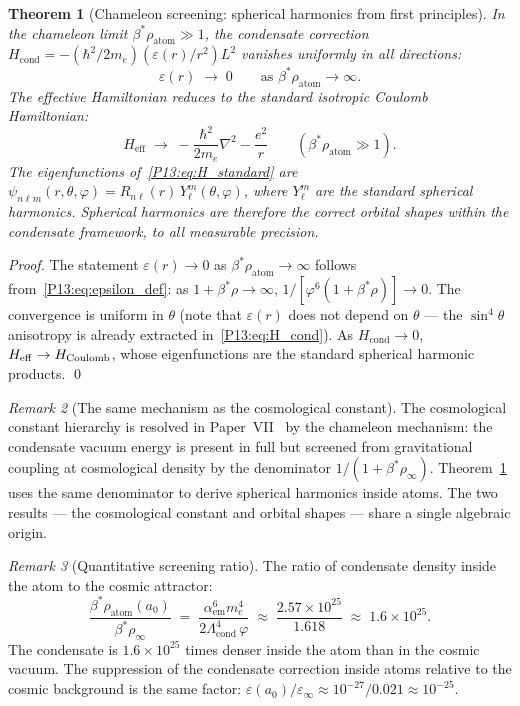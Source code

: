 \documentclass[11pt,a4paper]{article}
\newtheorem{theorem}{Theorem}[section]
\theoremstyle{definition}
\theoremstyle{remark}
\newtheorem{remark}[theorem]{Remark}
\newcommand{\vp}{\varphi}
\newcommand{\bst}{\beta^{*}}
\newcommand{\Lcond}{\Lambda_{\mathrm{cond}}}
\newcommand{\aem}{\alpha_{\mathrm{em}}}
\newcommand{\eps}{\varepsilon}
\newcommand{\Hcond}{H_{\mathrm{cond}}}
\newcommand{\Heff}{H_{\mathrm{eff}}}
\newcommand{\rhoa}{\rho_{\mathrm{atom}}}
\newcommand{\rhoinf}{\rho_{\infty}}
\newcommand{\epsr}{\varepsilon(r)}
\begin{document}
\begin{theorem}[Chameleon screening: spherical harmonics from first principles]
\label{P13:thm:chameleon_screening}
In the chameleon limit $\bst\rhoa\gg1$, the condensate correction
$\Hcond = -(\hbar^2/2m_e)(\epsr/r^2)L^2$ vanishes uniformly
in all directions:
\begin{equation}
  \epsr \;\to\; 0
  \qquad \text{as } \bst\rhoa \to \infty.
  \label{P13:eq:chameleon_limit}
\end{equation}
The effective Hamiltonian reduces to the standard isotropic
Coulomb Hamiltonian:
\begin{equation}
  \Heff \;\to\; -\frac{\hbar^2}{2m_e}\nabla^2 - \frac{e^2}{r}
  \qquad (\bst\rhoa \gg 1).
  \label{P13:eq:H_standard}
\end{equation}
The eigenfunctions of~\eqref{P13:eq:H_standard} are
$\psi_{n\ell m}(r,\theta,\varphi) = R_{n\ell}(r)\,Y_\ell^m(\theta,\varphi)$,
where $Y_\ell^m$ are the standard spherical harmonics.
Spherical harmonics are therefore the correct orbital shapes
within the condensate framework, to all measurable precision.
\end{theorem}

\begin{proof}
The statement $\epsr\to0$ as $\bst\rhoa\to\infty$ follows
from~\eqref{P13:eq:epsilon_def}: as $1+\bst\rho\to\infty$,
$1/[\vp^6(1+\bst\rho)]\to0$.
The convergence is uniform in $\theta$ (note that $\epsr$
does not depend on $\theta$ --- the $\sin^4\!\theta$ anisotropy
is already extracted in~\eqref{P13:eq:H_cond}).
As $\Hcond\to0$, $\Heff\to H_{\rm Coulomb}$, whose eigenfunctions
are the standard spherical harmonic products.
\qed
\end{proof}

\begin{remark}[The same mechanism as the cosmological constant]
\label{P13:rem:same_mechanism}
The cosmological constant hierarchy is resolved in Paper~VII~\cite{Paper7}
by the chameleon mechanism: the condensate vacuum energy is present in full
but screened from gravitational coupling at cosmological density by
the denominator $1/(1+\bst\rho_\infty)$.
Theorem~\ref{P13:thm:chameleon_screening} uses the same denominator
to derive spherical harmonics inside atoms.
The two results --- the cosmological constant and orbital shapes ---
share a single algebraic origin.
\end{remark}

\begin{remark}[Quantitative screening ratio]
\label{P13:rem:screening_ratio}
The ratio of condensate density inside the atom to the cosmic attractor:
\[
  \frac{\bst\rhoa(a_0)}{\bst\rhoinf}
  \;=\; \frac{\aem^6 m_e^4}{2\Lcond^4\,\vp}
  \;\approx\; \frac{2.57\times10^{25}}{1.618}
  \;\approx\; 1.6\times10^{25}.
\]
The condensate is $1.6\times10^{25}$ times denser inside the atom
than in the cosmic vacuum.
The suppression of the condensate correction inside atoms relative
to the cosmic background is the same factor:
$\eps(a_0)/\eps_\infty \approx 10^{-27}/0.021 \approx 10^{-25}$.
\end{remark}
\end{document}
